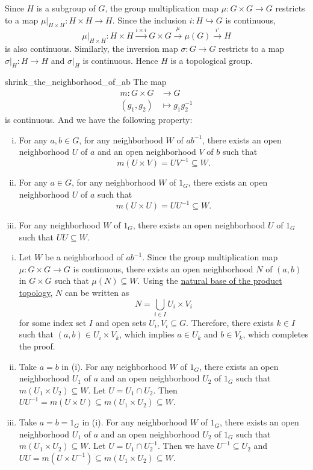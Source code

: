 \documentclass{report}
\begin{document}
\begin{prf}
	Since $H$ is a subgroup of $G$, the group multiplication map $\mu:G\times G\to G$ restricts to a map $\mu|_{H\times H}:H\times H\to H$. Since the inclusion $i:H\hookrightarrow G$ is continuous,
	\[
		\mu|_{H\times H}:H \times H \xrightarrow{i\times i} G\times G\xrightarrow{\mu}\mu(G)  \xrightarrow{i'} H
	\]
	is also continuous. Similarly, the inversion map $\sigma:G\to G$ restricts to a map $\sigma|_H:H\to H$ and $\sigma|_H$ is continuous. Hence $H$ is a topological group.

\end{prf}


\begin{lemma}{}{shrink_the_neighborhood_of_ab}
	The map 
	\begin{align*}
		m:G\times G & \longrightarrow G       \\
		(g_1,g_2)   & \longmapsto g_1g_2^{-1}
	\end{align*}
	is continuous. And we have the following property:
	\begin{enumerate}[(i)]
		\item For any $a ,b\in G$, for any neighborhood $W$ of $ab^{-1}$, there exists an open neighborhood $U$ of $a$ and an open neighborhood $V$ of $b$ such that 
		\[
		m(U\times V)=U V^{-1}\subseteq W.
		\]
		\item For any $a \in G$, for any neighborhood $W$ of $1_G$, there exists an open neighborhood $U$ of $a$ such that 
		\[
		m(U\times U)=U U^{-1}\subseteq W.
		\]
		\item For any neighborhood $W$ of $1_G$, there exists an open neighborhood $U$ of $1_G$ such that $UU\subseteq W$.
	\end{enumerate}
\end{lemma}
\begin{prf}
	\begin{enumerate}[(i)]
		\item Let $W$ be a neighborhood of $ab^{-1}$. Since the group multiplication map $\mu:G\times G\to G$ is continuous, there exists an open neighborhood $N$ of $(a,b)$ in $G\times G$ such that $\mu(N)\subseteq W$. Using the \hyperref[th:basis_of_product_topology]{natural base of the product topology}, $N$ can be written as 
	\[
	N=\bigcup_{i\in I} U_i\times V_i
	\]
	for some index set $I$ and open sets $U_i, V_i\subseteq G$. Therefore, there exists $k\in I$ such that $(a,b)\in U_i\times V_k$, which implies $a\in U_k$ and $b\in V_k$, which completes the proof.
	\item Take $a=b$ in (i). For any neighborhood $W$ of $1_G$, there exists an open neighborhood $U_1$ of $a$ and an open neighborhood $U_2$ of $1_G$ such that $m(U_1\times U_2)\subseteq W$. Let $U=U_1\cap U_2$. Then $UU^{-1}= m(U\times U)\subseteq m(U_1\times U_2)\subseteq W$.
	\item Take $a=b=1_G$ in (i). For any neighborhood $W$ of $1_G$, there exists an open neighborhood $U_1$ of $a$ and an open neighborhood $U_2$ of $1_G$ such that $m(U_1\times U_2)\subseteq W$. Let $U=U_1\cap U_2^{-1}$. Then we have $U^{-1}\subseteq U_2$ and $UU= m(U\times U^{-1})\subseteq m(U_1\times U_2)\subseteq W$.
\end{enumerate}
\end{prf}
\end{document}
